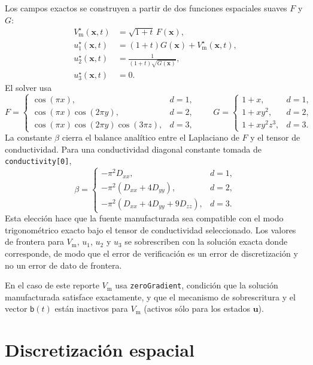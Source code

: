 \documentclass[11pt,a4paper]{article}
\newcommand{\code}[1]{\texttt{\small #1}}
\newcommand{\Vm}{V_{\text{m}}}
\begin{document}
Los campos exactos se construyen a partir de dos funciones espaciales suaves $F$ y $G$:
\begin{align}
  \Vm^\star(\mathbf{x},t) &= \sqrt{1+t}\,F(\mathbf{x}),\\
  u_1^\star(\mathbf{x},t) &= (1+t)G(\mathbf{x})+\Vm^\star(\mathbf{x},t),\\
  u_2^\star(\mathbf{x},t) &= \frac{1}{(1+t)\sqrt{G(\mathbf{x})}},\\
  u_3^\star(\mathbf{x},t) &= 0.
\end{align}
El solver usa
\begin{equation}
F =
\begin{cases}
\cos(\pi x), & d=1,\\
\cos(\pi x)\cos(2\pi y), & d=2,\\
\cos(\pi x)\cos(2\pi y)\cos(3\pi z), & d=3,
\end{cases}
\qquad
G =
\begin{cases}
1+x, & d=1,\\
1+x y^2, & d=2,\\
1+x y^2 z^3, & d=3.
\end{cases}
\end{equation}
La constante $\beta$ cierra el balance analítico entre el Laplaciano de $F$ y el tensor de
conductividad. Para una conductividad diagonal constante tomada de \code{conductivity[0]},
\begin{equation}
  \beta =
  \begin{cases}
    -\pi^2 D_{xx}, & d=1,\\
    -\pi^2(D_{xx}+4D_{yy}), & d=2,\\
    -\pi^2(D_{xx}+4D_{yy}+9D_{zz}), & d=3.
  \end{cases}
\end{equation}
Esta elección hace que la fuente manufacturada sea compatible con el modo trigonométrico
exacto bajo el tensor de conductividad seleccionado. Los valores de frontera para $\Vm$,
$u_1$, $u_2$ y $u_3$ se sobrescriben con la solución exacta donde corresponde, de modo que
el error de verificación es un error de discretización y no un error de dato de frontera.

En el caso de este reporte $\Vm$ usa \code{zeroGradient}, condición que la solución manufacturada satisface exactamente, y que el mecanismo de sobrescritura y el vector $\mathsf{b}(t)$ están inactivos para $\Vm$ (activos sólo para los estados $\mathbf{u}$).

\section{Discretización espacial}
\end{document}

